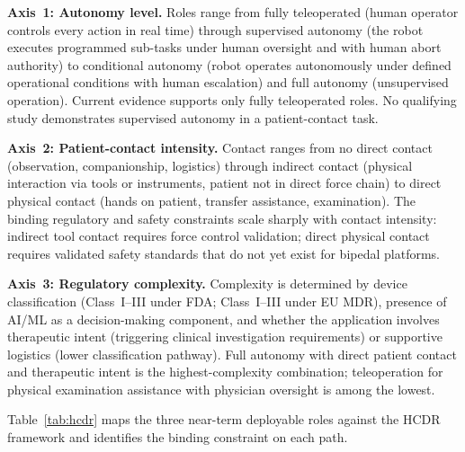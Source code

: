 \textbf{Axis~1: Autonomy level.} Roles range from fully teleoperated
(human operator controls every action in real time) through supervised autonomy
(the robot executes programmed sub-tasks under human oversight and with human
abort authority) to conditional autonomy (robot operates autonomously under
defined operational conditions with human escalation) and full autonomy
(unsupervised operation). Current evidence supports only fully teleoperated roles.
No qualifying study demonstrates supervised autonomy in a patient-contact task.

\textbf{Axis~2: Patient-contact intensity.} Contact ranges from no direct contact
(observation, companionship, logistics) through indirect contact (physical
interaction via tools or instruments, patient not in direct force chain) to direct
physical contact (hands on patient, transfer assistance, examination). The binding
regulatory and safety constraints scale sharply with contact intensity: indirect
tool contact requires force control validation; direct physical contact requires
validated safety standards that do not yet exist for bipedal platforms.

\textbf{Axis~3: Regulatory complexity.} Complexity is determined by device
classification (Class~I--III under FDA; Class~I--III under EU MDR), presence of
AI/ML as a decision-making component, and whether the application involves
therapeutic intent (triggering clinical investigation requirements) or supportive
logistics (lower classification pathway). Full autonomy with direct patient contact
and therapeutic intent is the highest-complexity combination; teleoperation for
physical examination assistance with physician oversight is among the lowest.

Table~\ref{tab:hcdr} maps the three near-term deployable roles against the HCDR
framework and identifies the binding constraint on each path.

